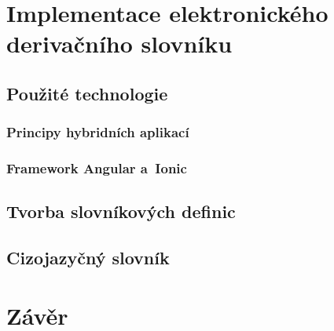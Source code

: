 \hypertarget{implementace-elektronickuxe9ho-derivaux10dnuxedho-slovnuxedku}{%
\chapter{Implementace elektronického derivačního
slovníku}\label{implementace-elektronickuxe9ho-derivaux10dnuxedho-slovnuxedku}}

\hypertarget{pouux17eituxe9-technologie}{%
\section{Použité technologie}\label{pouux17eituxe9-technologie}}

\hypertarget{principy-hybridnuxedch-aplikacuxed}{%
\subsection{Principy hybridních
aplikací}\label{principy-hybridnuxedch-aplikacuxed}}

\hypertarget{framework-angular-a-ionic}{%
\subsection{Framework Angular
a~Ionic}\label{framework-angular-a-ionic}}

\hypertarget{tvorba-slovnuxedkovuxfdch-definic}{%
\section{Tvorba slovníkových
definic}\label{tvorba-slovnuxedkovuxfdch-definic}}

\hypertarget{cizojazyux10dnuxfd-slovnuxedk}{%
\section{Cizojazyčný slovník}\label{cizojazyux10dnuxfd-slovnuxedk}}

\hypertarget{zuxe1vux11br}{%
\chapter*{Závěr}\label{zaver}
}
